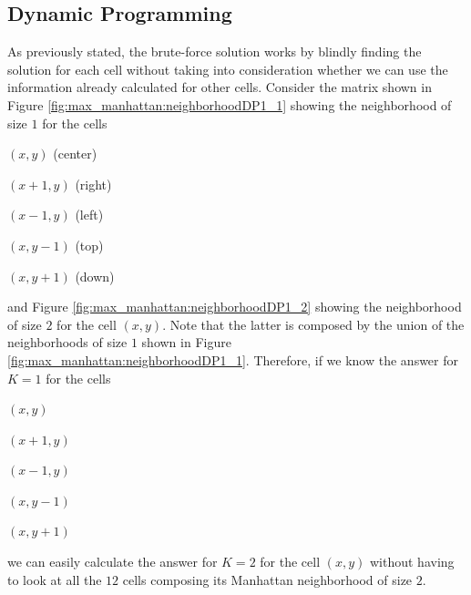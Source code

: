 \subsection{Dynamic Programming}
\label{max_manhattan:sec:DP}
As previously stated, the brute-force solution works by blindly finding the solution for each cell without taking into
consideration whether we can use the information already calculated for other cells.  Consider the matrix shown in Figure
\ref{fig:max_manhattan:neighborhoodDP1_1} showing the neighborhood of size $1$ for the cells 
\begin{itemize*}
    \item $(x,y)$ (center)
    \item $(x+1,y)$ (right)
    \item $(x-1,y)$ (left)
    \item $(x,y-1)$ (top)
    \item $(x,y+1)$ (down)
\end{itemize*}
and Figure \ref{fig:max_manhattan:neighborhoodDP1_2} showing the neighborhood of size $2$ for the
cell $(x,y)$. Note that the latter is composed by the union of the neighborhoods of size $1$ shown
in Figure \ref{fig:max_manhattan:neighborhoodDP1_1}. Therefore, if we know the answer for $K=1$ for
the cells 
\begin{itemize*}
    \item $(x,y)$
    \item $(x+1,y)$
    \item $(x-1,y)$
    \item $(x,y-1)$
    \item $(x,y+1)$ \end{itemize*} we can easily calculate the answer for $K=2$ for the cell $(x,y)$
without having to look at all the $12$ cells composing its Manhattan neighborhood of size $2$.



